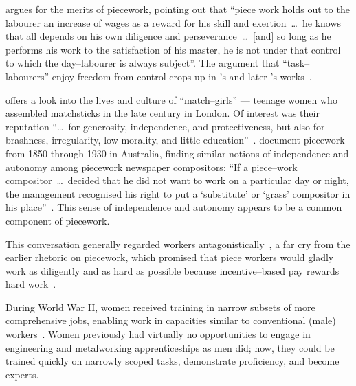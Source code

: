 \documentclass[trackingWork]{subfiles}
\begin{document}
\citeauthor{hughRaynbirdTaskWork} argues for the merits of piecework,
pointing out that
``piece work holds out to the labourer an increase of wages as a reward for his skill and exertion~\dots~he knows that all depends on his own diligence and perseverance~\dots~[and] so long as he performs his work to the satisfaction of his master, he is not under that control to which the day--labourer is always subject''.
The argument that ``task--labourers'' enjoy freedom from control crops up in \citeauthor{hughRaynbirdTaskWork}'s and later \citeauthor{rowan1901premium}'s works~\cite{hughRaynbirdTaskWork,rowan1901premium}.

\citeauthor{10.2307/3827491} offers a look into the lives and culture of ``match--girls''
--- teenage women who assembled matchsticks in the late  century in London. %
Of interest was their reputation ``\dots~for generosity, independence, and protectiveness,
but also for brashness, irregularity, low morality, and little education''~\cite{10.2307/3827491}.
\citeauthor{10.2307/27508091} document piecework from 1850 through 1930 in Australia,
finding similar notions of independence and autonomy among piecework newspaper compositors:
``If a piece--work compositor~\dots~decided that he did not want to work on a particular day or night, the management recognised his right to put a `substitute' or `grass' compositor in his place''~\cite{10.2307/27508091}.
This sense of independence and autonomy appears to be a common component of piecework.

This conversation generally regarded workers antagonistically~\cite{roy1954efficiency}, a far cry from the earlier rhetoric on piecework, which promised that
piece workers would gladly work as diligently and as hard as possible because
incentive--based pay rewards hard work~\cite{clark1908cotton}.


During World War II, women received training in narrow subsets of more comprehensive jobs, enabling work in capacities similar to conventional (male) workers~\cite{hart2013rise}.
Women previously had virtually no opportunities
to engage in engineering and metalworking apprenticeships as men did;
now, they
could be trained quickly on narrowly scoped tasks,
demonstrate proficiency, and become experts.
\end{document}
